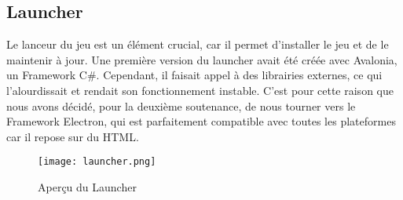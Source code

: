 \subsection{Launcher}

Le lanceur du jeu est un élément crucial, car il permet d'installer 
le jeu et de le maintenir à jour. Une première version du launcher avait 
été créée avec Avalonia, un Framework C\#. Cependant, il faisait appel à des 
librairies externes, ce qui l'alourdissait et rendait son fonctionnement instable. 
C'est pour cette raison que nous avons décidé, pour la deuxième soutenance, de nous 
tourner vers le Framework Electron, qui est parfaitement compatible avec toutes les 
plateformes car il repose sur du HTML.

\begin{figure}[hbt!]
    \centering
    \texttt{[image: launcher.png]}
    \caption{Aperçu du Launcher}
\end{figure}